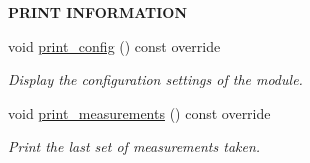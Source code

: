 \begin{Indent}{\bf P\+R\+I\+NT I\+N\+F\+O\+R\+M\+A\+T\+I\+ON}\par
\begin{DoxyCompactItemize}
\item 
void \hyperlink{class_loom___z_x_gesture_a7af9796af4c3dfa33a3eedb63de89285}{print\+\_\+config} () const override
\begin{DoxyCompactList}\small\item\em Display the configuration settings of the module. \end{DoxyCompactList}\item 
void \hyperlink{class_loom___z_x_gesture_a54559c9e2ecefad1efcb2a3192233bcb}{print\+\_\+measurements} () const override
\begin{DoxyCompactList}\small\item\em Print the last set of measurements taken. \end{DoxyCompactList}\end{DoxyCompactItemize}
\end{Indent}
